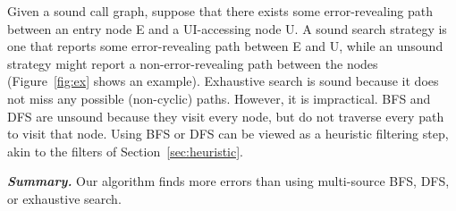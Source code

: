 
Given a sound call graph, suppose that there exists some
error-revealing path between an entry node E and a UI-accessing node U\@.  A sound
search strategy is one that reports some error-revealing path between
E and U, while an unsound strategy might report a non-error-revealing
path between the nodes (Figure~\ref{fig:ex} shows an example).
Exhaustive search is sound because it does not
miss any possible (non-cyclic) paths.  However, it is impractical.
BFS and DFS are unsound because they visit
every node, but do not traverse every path to visit that node.
Using BFS or DFS can be viewed as a heuristic filtering
step, akin to the filters of Section~\ref{sec:heuristic}.


\vspace{1mm}

\noindent \textbf{\textit{Summary.}} Our algorithm finds more errors than
using multi-source BFS, DFS, or exhaustive search.



